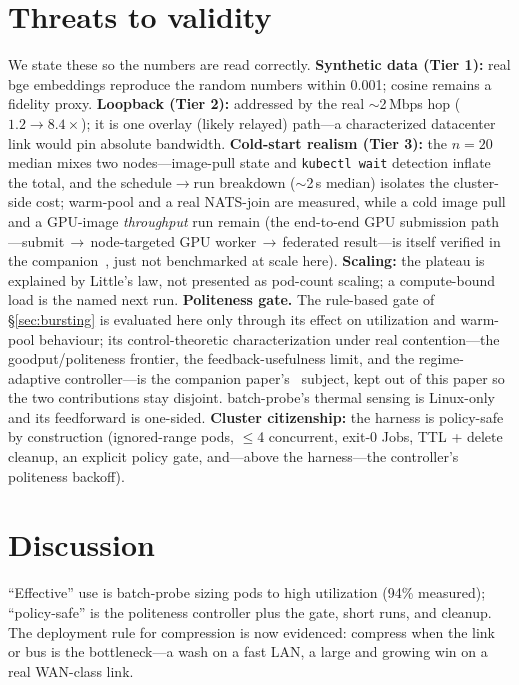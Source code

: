 \documentclass[conference]{IEEEtran}
\newcommand{\rev}[1]{#1}%
\begin{document}
\section{Threats to validity}\label{sec:threats}
We state these so the numbers are read correctly. \textbf{Synthetic data (Tier 1):} real bge
embeddings reproduce the random numbers within 0.001; cosine remains a fidelity proxy.
\textbf{Loopback (Tier 2):} addressed by the real $\sim$2\,Mbps hop ($1.2\!\to\!8.4\times$); it is
one overlay (likely relayed) path---a characterized datacenter link would pin absolute bandwidth.
\textbf{Cold-start realism (Tier 3):} the $n{=}20$ median mixes two nodes---image-pull state and
\texttt{kubectl wait} detection inflate the total, and the schedule$\to$run breakdown ($\sim$2\,s
median) isolates the cluster-side cost; warm-pool and a real NATS-join are
measured, while a cold image pull and a GPU-image \emph{throughput} run remain (the
end-to-end GPU submission path---submit\,$\to$\,node-targeted GPU worker\,$\to$\,federated
result---is itself verified in the companion~\cite{companion}, just not benchmarked at
scale here). \textbf{Scaling:} the plateau is
explained by Little's law, not presented as pod-count scaling; a compute-bound load is the named
next run. \textbf{Politeness gate.} \rev{The rule-based gate of \S\ref{sec:bursting} is evaluated here only
through its effect on utilization and warm-pool behaviour; its control-theoretic characterization
under real contention---the goodput/politeness frontier, the feedback-usefulness limit, and the
regime-adaptive controller---is the companion paper's~\cite{companion} subject, kept out of this
paper so the two contributions stay disjoint.}
batch-probe's thermal sensing is Linux-only and its feedforward is one-sided. \textbf{Cluster citizenship:} the
harness is policy-safe by construction (ignored-range pods, $\le$4 concurrent, exit-0 Jobs, TTL +
delete cleanup, an explicit policy gate, and---above the harness---the controller's politeness
backoff).

\section{Discussion}\label{sec:discussion}
``Effective'' use is batch-probe sizing pods to high utilization (94\% measured); ``policy-safe''
is the politeness controller plus the gate, short runs, and cleanup. The deployment rule for
compression is now evidenced: compress when the link or bus is the bottleneck---a wash on a fast
LAN, a large and growing win on a real WAN-class link.
\end{document}
